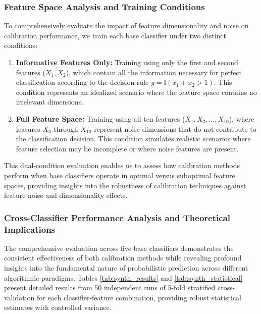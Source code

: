 \documentclass[12pt, a4paper]{article}
\begin{document}
\subsubsection{Feature Space Analysis and Training Conditions}

To comprehensively evaluate the impact of feature dimensionality and noise on calibration performance, we train each base classifier under two distinct conditions:

\begin{enumerate}
    \item \textbf{Informative Features Only:} Training using only the first and second features ($X_1, X_2$), which contain all the information necessary for perfect classification according to the decision rule $y = \mathbb{I}(x_1 + x_2 > 1)$. This condition represents an idealized scenario where the feature space contains no irrelevant dimensions.
    
    \item \textbf{Full Feature Space:} Training using all ten features ($X_1, X_2, \ldots, X_{10}$), where features $X_3$ through $X_{10}$ represent noise dimensions that do not contribute to the classification decision. This condition simulates realistic scenarios where feature selection may be incomplete or where noise features are present.
\end{enumerate}

This dual-condition evaluation enables us to assess how calibration methods perform when base classifiers operate in optimal versus suboptimal feature spaces, providing insights into the robustness of calibration techniques against feature noise and dimensionality effects.

\subsubsection{Cross-Classifier Performance Analysis and Theoretical Implications}

The comprehensive evaluation across five base classifiers demonstrates the consistent effectiveness of both calibration methods while revealing profound insights into the fundamental nature of probabilistic prediction across different algorithmic paradigms. Tables \ref{tab:synth_results} and \ref{tab:synth_statistical} present detailed results from 50 independent runs of 5-fold stratified cross-validation for each classifier-feature combination, providing robust statistical estimates with controlled variance.
\end{document}
